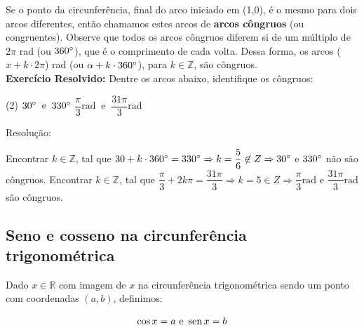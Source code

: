 Se o ponto da circunferência, final do arco iniciado em (1,0), é o mesmo para dois arcos diferentes, então chamamos estes arcos de \textbf{arcos côngruos} (ou congruentes). Observe que todos os arcos côngruos diferem si de um múltiplo de $2\pi$ rad (ou $360\degree$), que é o comprimento de cada volta. Dessa forma, os arcos ($x+k \cdot 2\pi$) rad (ou $\alpha+k \cdot 360\degree$), para $k \in \mathbb{Z}$, são côngruos.\\

\noindent
\textbf{Exercício Resolvido:} Dentre os arcos abaixo, identifique os côngruos:

\begin{tasks}(2)
    \task $30 \degree \;\; \text{e} \;\; 330 \degree$
    \task $\dfrac{\pi}{3} \text{rad} \;\; \text{e} \;\; \dfrac{31 \pi}{3} \text{rad}  $
\end{tasks}
\noindent
Resolução:\\
 
\begin{tasks}
    \task 	Encontrar $k \in \mathbb{Z}$, tal que $30 + k \cdot 360 \degree = 330 \degree \Rightarrow k = \dfrac{5}{6} \not \in Z \Rightarrow 30 \degree$ e $330 \degree$ não são côngruos.
    \task 	Encontrar $k \in \mathbb{Z}$, tal que $\dfrac{\pi}{3} + 2k \pi = \dfrac{31 \pi}{3} \Rightarrow k = 5 \in Z \Rightarrow \dfrac{\pi}{3} \text{rad e }\dfrac{31 \pi}{3} \text{rad}$ são côngruos.
\end{tasks}

\subsection{Seno e cosseno na circunferência trigonométrica}

Dado  $x \in \mathbb{R}$ com imagem de $x$ na circunferência trigonométrica sendo um ponto com coordenadas $(a,b)$, definimos:

\begin{tcolorbox}[colback=white,colframe=minha_cor,coltitle=black,title=Definição: Seno e cosseno] 
\[
\cos x = a \text{  e  } \operatorname{sen} x = b
\]
\end{tcolorbox}

